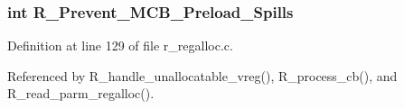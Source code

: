 \subsubsection{\setlength{\rightskip}{0pt plus 5cm}int \bf{R\_\-Prevent\_\-MCB\_\-Preload\_\-Spills}}\label{r__regspill_8c_524ba9bc74fe12c1750b3b0af8b451cf}




Definition at line 129 of file r\_\-regalloc.c.

Referenced by R\_\-handle\_\-unallocatable\_\-vreg(), R\_\-process\_\-cb(), and R\_\-read\_\-parm\_\-regalloc().